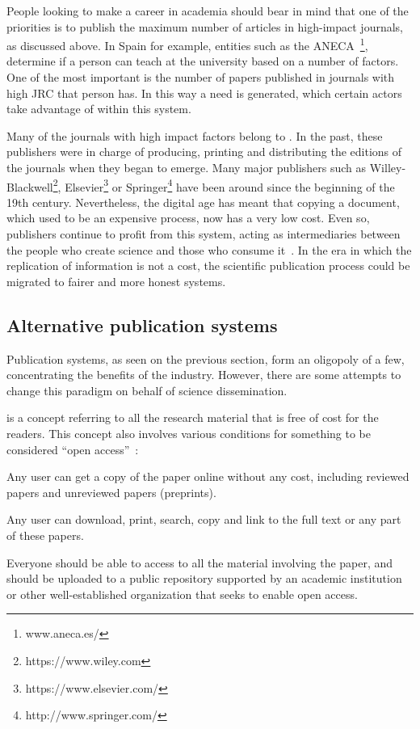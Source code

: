 People looking to make a career in academia should bear in mind that one of the
priorities is to publish the maximum number of articles in high-impact journals,
as discussed above. In Spain for example, entities such as the
ANECA~\footnote{www.aneca.es/}, determine if a person can teach at the
university based on a number of factors. One of the most important is the number
of papers published in journals with high JRC that person has. In this way a
need is generated, which certain actors take advantage of within this system.

Many of the journals with high impact factors belong to . In the
past, these publishers were in charge of producing, printing and distributing
the editions of the journals when they began to emerge. Many major publishers
such as Willey-Blackwell\footnote{https://www.wiley.com},
Elsevier\footnote{https://www.elsevier.com/} or
Springer\footnote{http://www.springer.com/} have been around since the beginning
of the 19th century. Nevertheless, the digital age has meant that copying a
document, which used to be an expensive process, now has a very low cost. Even
so, publishers continue to profit from this system, acting as intermediaries
between the people who create science and those who consume
it~\cite{lariviere2015oligopoly}. In the era in which the replication of
information is not a cost, the scientific publication process could be migrated
to fairer and more honest systems.

\subsection{Alternative publication systems}
\label{soa:aps}

Publication systems, as seen on the previous section, form an oligopoly of a
few, concentrating the benefits of the industry. However, there are some
attempts to change this paradigm on behalf of science dissemination.

 is a concept referring to all the research material that is
free of cost for the readers. This concept also involves various conditions for
something to be considered ``open access''~\cite{bailey2007open}:

\begin{itemize}
  
   Any user can get a copy of the paper online
  without any cost, including reviewed papers and unreviewed papers (preprints).
  
   Any user can download, print, search, copy and link to
  the full text or any part of these papers.

   Everyone should be able to access to all the material
  involving the paper, and should be uploaded to a public repository supported
  by an academic institution or other well-established organization that seeks
  to enable open access.
\end{itemize}

